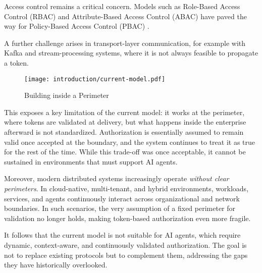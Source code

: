 \vspace{0.5em} Access control remains a critical concern. Models such as Role-Based Access Control (RBAC) and Attribute-Based Access Control (ABAC) have paved the way for Policy-Based Access Control (PBAC) \cite{c7}.  

\vspace{0.5em} A further challenge arises in transport-layer communication, for example with Kafka and stream-processing systems, where it is not always feasible to propagate a token.

\begin{figure}[htbp]
    \centering
    \texttt{[image: introduction/current-model.pdf]}
    \caption{Building inside a Perimeter}
    \label{fig:current-model}
\end{figure}

\vspace{0.5em} This exposes a key limitation of the current model: it works at the perimeter, where tokens are validated at delivery, but what happens inside the enterprise afterward is not standardized. 
Authorization is essentially assumed to remain valid once accepted at the boundary, and the system continues to treat it as true for the rest of the time.  
While this trade-off was once acceptable, it cannot be sustained in environments that must support AI agents.  

Moreover, modern distributed systems increasingly operate \emph{without clear perimeters}. 
In cloud-native, multi-tenant, and hybrid environments, workloads, services, and agents continuously interact across organizational and network boundaries. 
In such scenarios, the very assumption of a fixed perimeter for validation no longer holds, making token-based authorization even more fragile.  

It follows that the current model is not suitable for AI agents, which require dynamic, context-aware, and continuously validated authorization. 
The goal is not to replace existing protocols but to complement them, addressing the gaps they have historically overlooked.
